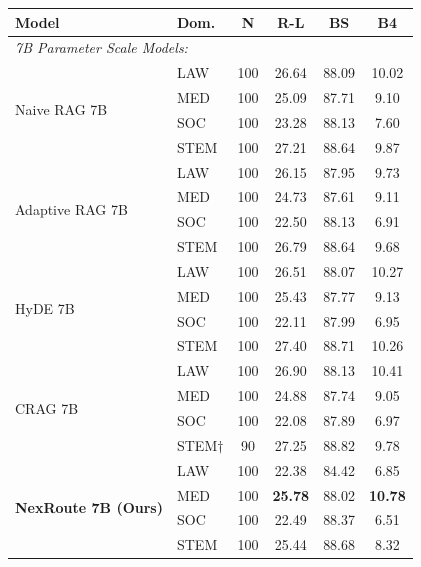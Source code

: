 \documentclass[a4paper,fleql]{cas-sc}
\begin{document}
\newpage
\vspace{6pt plus 4pt minus 3pt}

\begin{center}
\begingroup
\small %
\renewcommand{\arraystretch}{0.9} %
\label{tab:domain_breakdown}
\begin{tabular}{llcccc}
\toprule
\textbf{Model} & \textbf{Dom.} & \textbf{N} & \textbf{R-L} & \textbf{BS} & \textbf{B4} \\
\midrule
\multicolumn{6}{l}{\textit{7B Parameter Scale Models:}} \\
\multirow{4}{*}{Naive RAG 7B}
  & LAW  & 100 & 26.64 & 88.09 & 10.02 \\
  & MED  & 100 & 25.09 & 87.71 &  9.10 \\
  & SOC  & 100 & 23.28 & 88.13 &  7.60 \\
  & STEM & 100 & 27.21 & 88.64 &  9.87 \\
\midrule
\multirow{4}{*}{Adaptive RAG 7B}
  & LAW  & 100 & 26.15 & 87.95 &  9.73 \\
  & MED  & 100 & 24.73 & 87.61 &  9.11 \\
  & SOC  & 100 & 22.50 & 88.13 &  6.91 \\
  & STEM & 100 & 26.79 & 88.64 &  9.68 \\
\midrule
\multirow{4}{*}{HyDE 7B}
  & LAW  & 100 & 26.51 & 88.07 & 10.27 \\
  & MED  & 100 & 25.43 & 87.77 &  9.13 \\
  & SOC  & 100 & 22.11 & 87.99 &  6.95 \\
  & STEM & 100 & 27.40 & 88.71 & 10.26 \\
\midrule
\multirow{4}{*}{CRAG 7B}
  & LAW  & 100 & 26.90 & 88.13 & 10.41 \\
  & MED  & 100 & 24.88 & 87.74 &  9.05 \\
  & SOC  & 100 & 22.08 & 87.89 &  6.97 \\
  & STEM$\dagger$ &  90 & 27.25 & 88.82 &  9.78 \\
\midrule
\multirow{4}{*}{\textbf{NexRoute 7B (Ours)}}
  & LAW  & 100 & 22.38 & 84.42 &  6.85 \\ %
  & MED  & 100 & \textbf{25.78} & 88.02 & \textbf{10.78} \\
  & SOC  & 100 & 22.49 & 88.37 &  6.51 \\
  & STEM & 100 & 25.44 & 88.68 &  8.32 \\
\bottomrule
\end{tabular}
\endgroup
\end{center}
\end{document}
